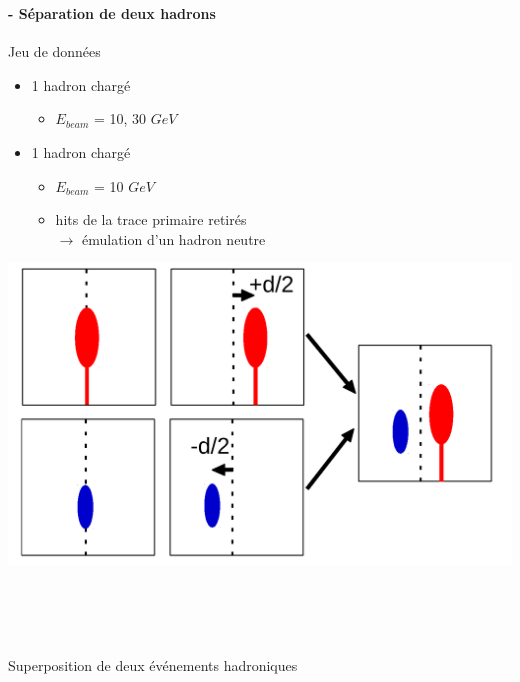 \documentclass[8pt]{beamer}
\begin{document}
  \begin{frame}
  \frametitle{\secname}
  \framesubtitle{\subsecname - Séparation de deux hadrons}
    \begin{minipage}{0.41\linewidth}
      \begin{block}{Jeu de données}
        \begin{itemize}
          \item 1 hadron chargé
          \begin{itemize}
            \item $E_{beam}$ = 10, 30 $GeV$
          \end{itemize}
          \item 1 hadron chargé
          \begin{itemize}
            \item $E_{beam}$ = 10 $GeV$
            \item hits de la trace primaire retirés \\
            $\rightarrow$ émulation d'un hadron neutre
          \end{itemize}
        \end{itemize}
      \end{block}
    \end{minipage} \hfill
    \begin{minipage}{0.55\linewidth}
      \begin{center}
        \includegraphics[width=\linewidth]{OverlayEvent.pdf}
      \end{center}
    \end{minipage}
    ~ \\
    ~ \\
    ~ \\
    \begin{block}{Superposition de deux événements hadroniques}

\end{block}
\end{frame}
\end{document}
